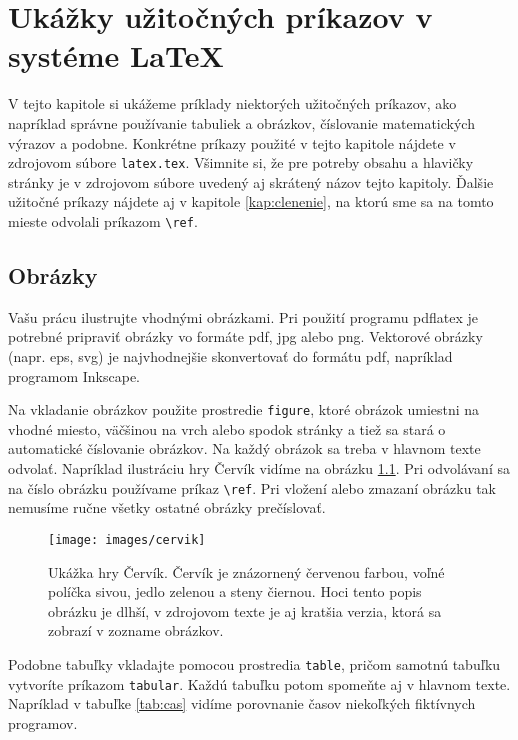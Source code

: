\chapter[LaTeX]{Ukážky užitočných príkazov v systéme LaTeX}
\label{kap:latex}

V tejto kapitole si ukážeme príklady niektorých užitočných príkazov,
ako napríklad správne používanie tabuliek a obrázkov, číslovanie
matematických výrazov a podobne. Konkrétne príkazy použité v tejto
kapitole nájdete v zdrojovom súbore \verb'latex.tex'.  Všimnite si, že
pre potreby obsahu a hlavičky stránky je v zdrojovom súbore uvedený aj
skrátený názov tejto kapitoly. Ďalšie užitočné príkazy nájdete aj v
kapitole \ref{kap:clenenie}, na ktorú sme sa na tomto mieste odvolali
príkazom \verb'\ref'.

\section{Obrázky}

Vašu prácu ilustrujte vhodnými obrázkami. Pri použití programu
pdflatex je potrebné pripraviť obrázky vo formáte pdf, jpg alebo
png. Vektorové obrázky (napr. eps, svg) je najvhodnejšie skonvertovať
do formátu pdf, napríklad programom Inkscape.

Na vkladanie obrázkov použite prostredie \verb'figure', ktoré obrázok
umiestni na vhodné miesto, väčšinou na vrch alebo spodok stránky a
tiež sa stará o automatické číslovanie obrázkov. Na každý obrázok sa
treba v hlavnom texte odvolať. Napríklad ilustráciu hry Červík vidíme
na obrázku \ref{obr:cursus}. Pri odvolávaní sa na číslo obrázku
používame príkaz \verb'\ref'. Pri vložení alebo zmazaní obrázku tak
nemusíme ručne všetky ostatné obrázky prečíslovať.

\begin{figure}
\centerline{\texttt{[image: images/cervik]}}
\caption[Ukážka hry Červík]{Ukážka hry Červík. Červík je znázornený červenou farbou, voľné políčka sivou, jedlo zelenou a steny čiernou. Hoci tento popis obrázku je dlhší, v zdrojovom texte je aj kratšia verzia, ktorá sa zobrazí v zozname obrázkov.}
\label{obr:cursus}
\end{figure}

Podobne tabuľky vkladajte pomocou prostredia \verb'table', pričom
samotnú tabuľku vytvoríte príkazom \verb'tabular'. Každú tabuľku potom
spomeňte aj v hlavnom texte. Napríklad v tabuľke \ref{tab:cas}
vidíme porovnanie časov niekoľkých fiktívnych programov.

